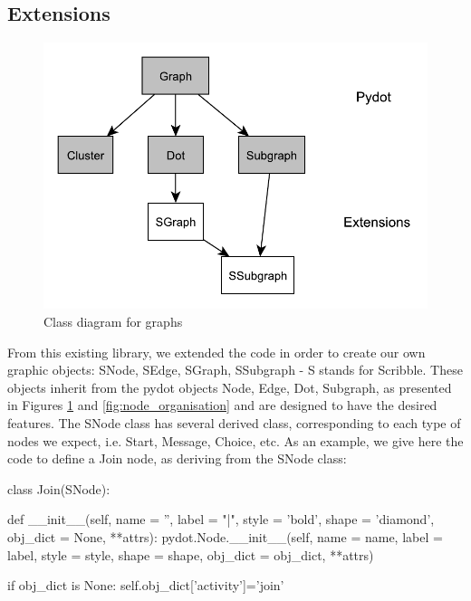 \documentclass[a4paper,11pt,twoside]{report}
\begin{document}
\subsection{Extensions}
\begin{figure}[h]
\begin{center}
\includegraphics[scale=0.7]{graph_organisation}
\end{center}
\caption{Class diagram for graphs}
\label{fig:graph_organisation}
\end{figure}
From this existing library, we extended the code in order to create our own graphic objects: SNode, SEdge, SGraph, SSubgraph - S stands for Scribble. These objects inherit from the pydot objects Node, Edge, Dot, Subgraph, as presented in Figures \ref{fig:graph_organisation} and \ref{fig:node_organisation} and are designed to have the desired features. The SNode class has several derived class, corresponding to each type of nodes we expect, i.e. Start, Message, Choice, etc. As an example, we give here the code to define a Join node, as deriving from the SNode class:
\begin{SJLISTING}
class Join(SNode):
    
    def __init__(self, name = '', label = "|", style = 'bold', shape = 'diamond', obj_dict = None, **attrs):
        pydot.Node.__init__(self, name = name, label = label, style = style, shape = shape, 
				obj_dict = obj_dict, **attrs)
        
        if obj_dict is None:
            self.obj_dict['activity']='join'
\end{SJLISTING}
\end{document}
